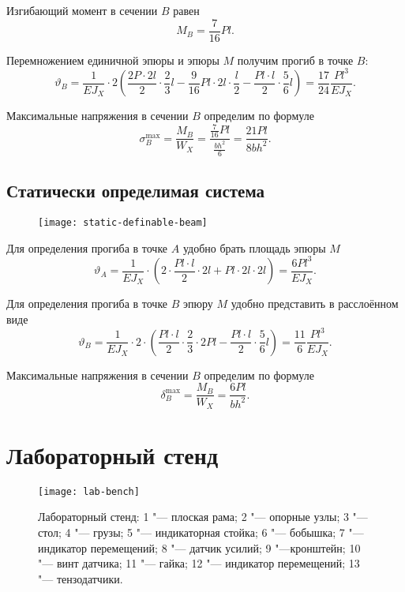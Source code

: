 Изгибающий момент в сечении $B$ равен
\[
    M_B = \frac{7}{16} P l.
\]

Перемножением единичной эпюры и эпюры $M$ получим прогиб в точке $B$:
\[
    \vartheta_B
    = \frac{1}{E J_X} \cdot 2 \left(\frac{2 P \cdot 2 l}{2} \cdot \frac{2}{3} l - \frac{9}{16} P l \cdot 2 l \cdot \frac{l}{2} - \frac{P l \cdot l}{2} \cdot \frac{5}{6} l\right)
    = \frac{17}{24} \frac{P l^3}{E J_X}.
\]

Максимальные напряжения в сечении $B$ определим по формуле
\[
    \sigma_B^{\max}
    = \frac{M_B}{W_X}
    = \frac{\frac{7}{16} P l}{\frac{b h^2}{6}}
    = \frac{21 P l}{8 b h^2}.
\]

\subsection{Статически определимая система}

\begin{figure}[!ht]
    \centering
    \texttt{[image: static-definable-beam]}
    \caption{
    }
    \label{fig:static-definable-beam}
\end{figure}

Для определения прогиба в точке $A$ удобно брать площадь эпюры $M$
\[
    \vartheta_A
    = \frac{1}{E J_X} \cdot \left(2 \cdot \frac{P l \cdot l}{2} \cdot 2 l + P l \cdot 2 l \cdot 2 l\right)
    = \frac{6 P l^3}{E J_X}.
\]

Для определения прогиба в точке $B$ эпюру $M$ удобно представить в расслоённом виде
\[
    \vartheta_B
    = \frac{1}{E J_X} \cdot 2 \cdot \left(\frac{P l \cdot l}{2} \cdot \frac{2}{3} \cdot 2 P l - \frac{P l \cdot l}{2} \cdot \frac{5}{6} l\right)
    = \frac{11}{6} \frac{P l^3}{E J_X}.
\]

Максимальные напряжения в сечении $B$ определим по формуле
\[
    \delta_B^{\max}
    = \frac{M_B}{W_X}
    = \frac{6 P l}{b h^2}.
\]

\section{Лабораторный стенд}

\begin{figure}[!ht]
    \centering
    \texttt{[image: lab-bench]}
    \caption{Лабораторный стенд:
        1 "--- плоская рама;
        2 "--- опорные узлы;
        3 "--- стол;
        4 "--- грузы;
        5 "--- индикаторная стойка;
        6 "--- бобышка;
        7 "---  индикатор  перемещений;
        8 "---  датчик  усилий;
        9 "---кронштейн;
        10 "--- винт датчика;
        11 "--- гайка;
        12 "--- индикатор перемещений;
        13 "--- тензодатчики.
    }
    \label{fig:lab-bench}
\end{figure}

